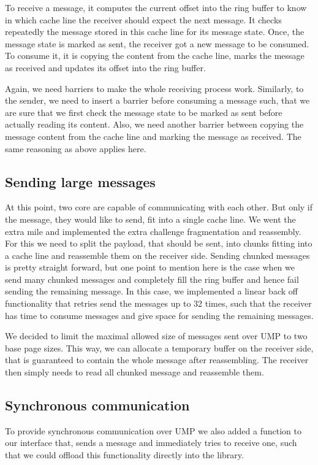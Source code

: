 To receive a message, it computes the current offset into the ring buffer to know in which cache line the receiver should expect the next message. It  checks repeatedly the message stored in this cache line for its message state. Once, the message state is marked as sent, the receiver got a new message to be consumed. To consume it, it is copying the content from the cache line, marks the message as received and updates its offset into the ring buffer.

Again, we need barriers to make the whole receiving process work. Similarly, to the sender, we need to insert a barrier before consuming a message such, that we are sure that we first check the message state to be marked as sent before actually reading its content. Also, we need another barrier between copying the message content from the cache line and marking the message as received. The same reasoning as above applies here.

\subsection{Sending large messages}

At this point, two core are capable of communicating with each other. But only if the message, they would like to send, fit into a single cache line. We went the extra mile and implemented the extra challenge fragmentation and reassembly. For this we need to split the payload, that should be sent, into chunks fitting into a cache line and reassemble them on the receiver side. Sending chunked messages is pretty straight forward, but one point to mention here is the case when we send many chunked messages and completely fill the ring buffer and hence fail sending the remaining message. In this case, we implemented a linear back off functionality that retries send the messages up to 32 times, such that the receiver has time to consume messages and give space for sending the remaining messages.

We decided to limit the maximal allowed size of messages sent over UMP to two base page sizes. This way, we can allocate a temporary buffer on the receiver side, that is guaranteed to contain the whole message after reassembling. The receiver then simply needs to read all chunked message and reassemble them.

\subsection{Synchronous communication}

To provide synchronous communication over UMP we also added a function to our interface that, sends a message and immediately tries to receive one, such that we could offload this functionality directly into the library.

